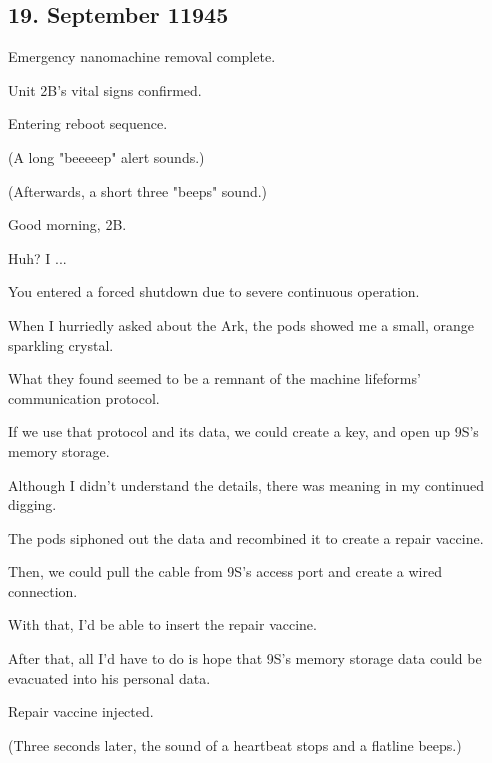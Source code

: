 \subsection{19. September 11945}
\begin{play}
	  Emergency nanomachine removal complete.
	
	  Unit 2B's vital signs confirmed.
	
	  Entering reboot sequence.
	
	(A long "beeeeep" alert sounds.)
	
	(Afterwards, a short three "beeps" sound.)
	
	  Good morning, 2B.
	
	  Huh? I ...
	
	  You entered a forced shutdown due to severe continuous operation.
	
	  When I hurriedly asked about the Ark, the pods showed me a small, orange sparkling crystal.
	
	  What they found seemed to be a remnant of the machine lifeforms' communication protocol.
	
	  If we use that protocol and its data, we could create a key, and open up 9S's memory storage.
	
	  Although I didn't understand the details, there was meaning in my continued digging.
	
	  The pods siphoned out the data and recombined it to create a repair vaccine.
	
	  Then, we could pull the cable from 9S's access port and create a wired connection.
	
	  With that, I'd be able to insert the repair vaccine.
	
	  After that, all I'd have to do is hope that 9S's memory storage data could be evacuated into his personal data.
	
	  Repair vaccine injected.
	
	(Three seconds later, the sound of a heartbeat stops and a flatline beeps.)
	

\end{play}
